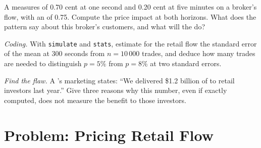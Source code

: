 \begin{exercise}[$\star\star$]\label{exo:m1:retail-flow-and-wholesaling:6}
A  measures  of 0.70 cent at one second and 0.20
cent at five minutes on a broker's flow, with an  of
0.75. Compute the price impact at both horizons. What does the pattern say
about this broker's customers, and what will the  do?
\end{exercise}

\begin{exercise}[$\star\star\star$]\label{exo:m1:retail-flow-and-wholesaling:7}
\emph{Coding.} With \texttt{simulate} and \texttt{stats}, estimate for the
retail flow the standard error of the mean  at 300
seconds from $n = 10\,000$ trades, and deduce how many trades are needed to
distinguish $p = 5\%$ from $p = 8\%$ at two standard errors.
\end{exercise}

\begin{exercise}[$\star\star\star$]\label{exo:m1:retail-flow-and-wholesaling:8}
\emph{Find the flaw.} A 's marketing states: ``We delivered \$1.2
billion of  to retail investors last year.'' Give three
reasons why this number, even if exactly computed, does not measure the
benefit to those investors.
\end{exercise}

\section{Problem: Pricing Retail Flow}

